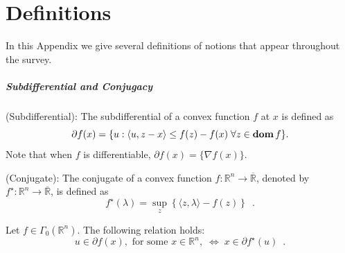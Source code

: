 \documentclass[openany]{now}
\newcommand{\reals}{{\mathbb R}}
\newcommand{\dom}{\mathop{\bf dom}}
\begin{document}
\chapter{Definitions}{\label{App::Definitions}}
In this Appendix we give several definitions of notions that appear throughout the survey.

\paragraph{Subdifferential and Conjugacy}
 (Subdifferential): The subdifferential of a convex function $f$ at $x$ is defined as 
\[
\partial f(x)=\{u : \langle u,z-x\rangle\le f(z)-f(x)\;\forall z \in \dom f\}.
\]
Note that when $f$ is differentiable, $\partial f(x)=\{\nabla f(x)\}$.

 (Conjugate): The conjugate of a convex function $f:\reals^n\to\overline{\reals}$, denoted by $f^\star:\reals^n\to\overline{\reals}$, is defined as 
\[
f^\star(\lambda)=\underset{z}{\sup}\left\{\langle z,\lambda\rangle-f(z)\right\}\enspace.
\]
\begin{theorem}{\label{App:conj_subd}}
Let $f\in\Gamma_0(\reals^n)$. The following relation holds:
\begin{equation*}
u\in\partial f(x), \mbox{ for some } x\in\reals^n, \; \Leftrightarrow \; x\in\partial f^\star(u)\enspace.
\end{equation*}
\end{theorem}
\end{document}
